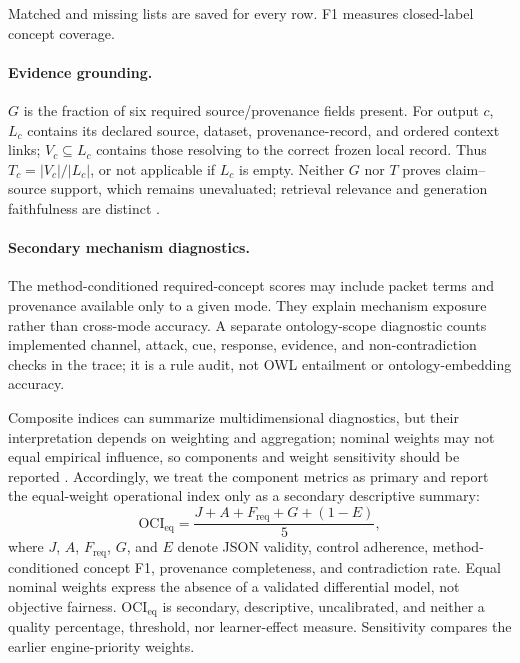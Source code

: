 \documentclass[runningheads]{llncs}
\begin{document}
Matched and missing lists are saved for every row. F1 measures closed-label
concept coverage.

\paragraph{Evidence grounding.}
$G$ is the fraction of six required source/provenance fields present. For output
$c$, $L_c$ contains its declared source, dataset, provenance-record, and ordered
context links; $V_c\subseteq L_c$ contains those resolving to the correct frozen
local record. Thus $T_c=|V_c|/|L_c|$, or not applicable if $L_c$ is empty.
Neither $G$ nor $T$ proves claim--source support, which remains unevaluated;
retrieval relevance and generation faithfulness are distinct \cite{es2024ragas}.

\paragraph{Secondary mechanism diagnostics.}
The method-conditioned required-concept scores may include packet terms and
provenance available only to a given mode. They explain mechanism exposure rather
than cross-mode accuracy. A separate ontology-scope diagnostic counts implemented
channel, attack, cue, response, evidence, and non-contradiction checks in the
trace; it is a rule audit, not OWL entailment or ontology-embedding accuracy.

Composite indices can summarize multidimensional diagnostics, but their
interpretation depends on weighting and aggregation; nominal weights may not
equal empirical influence, so components and weight sensitivity should be reported
\cite{greco2019composite,becker2017weights}. Accordingly, we treat the component
metrics as primary and report the equal-weight operational index only as a
secondary descriptive summary:
\begin{equation}
\mathrm{OCI}_{\mathrm{eq}}=
\frac{J+A+F_{\mathrm{req}}+G+(1-E)}{5},
\label{eq:operational-index}
\end{equation}
where $J$, $A$, $F_{\mathrm{req}}$, $G$, and $E$ denote JSON validity, control
adherence, method-conditioned concept F1, provenance completeness, and
contradiction rate. Equal nominal weights express the absence of a validated
differential model, not objective fairness. OCI$_{\mathrm{eq}}$ is secondary,
descriptive, uncalibrated, and neither a quality percentage, threshold, nor
learner-effect measure. Sensitivity compares the earlier engine-priority weights.
\end{document}
